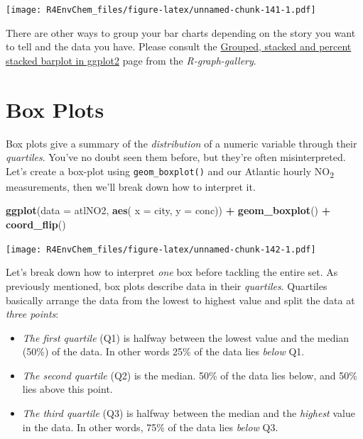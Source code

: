 \documentclass[
]{book}
\newenvironment{Shaded}{\begin{snugshade}}{\end{snugshade}}
\newcommand{\AttributeTok}[1]{\textcolor[rgb]{0.13,0.29,0.53}{#1}}
\newcommand{\FunctionTok}[1]{\textcolor[rgb]{0.13,0.29,0.53}{\textbf{#1}}}
\newcommand{\NormalTok}[1]{#1}
\newcommand{\SpecialCharTok}[1]{\textcolor[rgb]{0.81,0.36,0.00}{\textbf{#1}}}
\providecommand{\tightlist}{%
  \setlength{\itemsep}{0pt}\setlength{\parskip}{0pt}}
\begin{document}
\texttt{[image: R4EnvChem\_files/figure-latex/unnamed-chunk-141-1.pdf]}

There are other ways to group your bar charts depending on the story you want to tell and the data you have. Please consult the \href{https://www.r-graph-gallery.com/48-grouped-barplot-with-ggplot2.html}{Grouped, stacked and percent stacked barplot in ggplot2} page from the \emph{R-graph-gallery}.

\hypertarget{box-plots}{%
\section{Box Plots}\label{box-plots}}

Box plots give a summary of the \emph{distribution} of a numeric variable through their \emph{quartiles}. You've no doubt seen them before, but they're often misinterpreted. Let's create a box-plot using \texttt{geom\_boxplot()} and our Atlantic hourly NO\textsubscript{2} measurements, then we'll break down how to interpret it.

\begin{Shaded}
\begin{Highlighting}[]
\FunctionTok{ggplot}\NormalTok{(}\AttributeTok{data =}\NormalTok{ atlNO2, }
       \FunctionTok{aes}\NormalTok{( }\AttributeTok{x =}\NormalTok{ city, }\AttributeTok{y =}\NormalTok{ conc)) }\SpecialCharTok{+}
  \FunctionTok{geom\_boxplot}\NormalTok{() }\SpecialCharTok{+} 
  \FunctionTok{coord\_flip}\NormalTok{()}
\end{Highlighting}
\end{Shaded}

\texttt{[image: R4EnvChem\_files/figure-latex/unnamed-chunk-142-1.pdf]}

Let's break down how to interpret \emph{one} box before tackling the entire set. As previously mentioned, box plots describe data in their \emph{quartiles}. Quartiles basically arrange the data from the lowest to highest value and split the data at \emph{three points}:

\begin{itemize}
\tightlist
\item
  \emph{The first quartile} (Q1) is halfway between the lowest value and the median (50\%) of the data. In other words 25\% of the data lies \emph{below} Q1.
\item
  \emph{The second quartile} (Q2) is the median. 50\% of the data lies below, and 50\% lies above this point.
\item
  \emph{The third quartile} (Q3) is halfway between the median and the \emph{highest} value in the data. In other words, 75\% of the data lies \emph{below} Q3.
\end{itemize}
\end{document}
